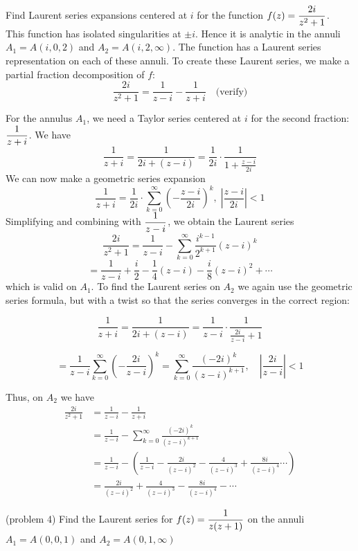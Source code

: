 \documentclass[handout]{ximera}
\begin{document}
\begin{example}[example 4]
Find Laurent series expansions centered at $i$ for the function $\displaystyle f(z) = \frac{2i}{z^2+1}$.\\
This function has isolated singularities at $\pm i$. Hence it is analytic in the annuli
$A_1 = A(i,0,2)$ and $A_2 = A(i, 2, \infty)$. The function has a Laurent series representation on each of these annuli.
To create these Laurent series, we make a partial fraction decomposition of $f$:
\[
\frac{2i}{z^2+1} = \frac{1}{z-i} - \frac{1}{z+i} \quad \text{(verify)}
\]

For the annulus $A_1$, we need a Taylor series centered at $i$ for the second fraction: $\displaystyle \frac{1}{z+i}$.
We have
\[
\frac{1}{z+i} = \frac{1}{2i+(z-i)} = \frac{1}{2i} \cdot \frac{1}{1+ \frac{z-i}{2i}}
\]
We can now make a geometric series expansion 
\[
\frac{1}{z+i} = \frac{1}{2i} \cdot \sum_{k=0}^\infty \left(-\frac{z-i}{2i}\right)^k, \; \left|\frac{z-i}{2i}\right| < 1
\]
Simplifying and combining with $\displaystyle \frac{1}{z-i}$, we obtain the Laurent series
\[
\frac{2i}{z^2+1} = \frac{1}{z-i} - \sum_{k=0}^\infty \frac{i^{k-1}}{2^{k+1}}(z-i)^k 
\]
\[
= \frac{1}{z-i} + \frac{i}{2} - \frac{1}{4}(z-i) - \frac{i}{8}(z-i)^2 + \cdots
\]
which is valid on $A_1$.
To find the Laurent series on $A_2$ we again use the geometric series formula, but with a twist so that the series converges in the correct region:

\[
\frac{1}{z+i} = \frac{1}{2i + (z-i)} = \frac{1}{z-i} \cdot  \frac{1}{\frac{2i}{z-i} +1}
\]

\[
= \frac{1}{z-i} \sum_{k=0}^\infty \left(-\frac{2i}{z-i}\right)^k = \sum_{k=0}^\infty \frac{(-2i)^k}{(z-i)^{k+1}}, \quad \left|\frac{2i}{z-i}\right| < 1
\]

Thus, on $A_2$ we have
\begin{align*}
\frac{2i}{z^2 +1} &= \frac{1}{z-i} -\frac{1}{z+i}\\
&=\frac{1}{z-i} - \sum_{k=0}^\infty \frac{(-2i)^k}{(z-i)^{k+1}}\\
&= \frac{1}{z-i} - \left(\frac{1}{z-i}-\frac{2i}{(z-i)^2}-\frac{4}{(z-i)^3}+\frac{8i}{(z-i)^4} \cdots \right)\\
&= \frac{2i}{(z-i)^2}+\frac{4}{(z-i)^3}-\frac{8i}{(z-i)^4} -\cdots
\end{align*}


\end{example}


\begin{problem}(problem 4)
Find the Laurent series for $\displaystyle f(z) = \frac{1}{z(z+1)}$ on the annuli $A_1 = A(0, 0, 1)$ and $A_2 = A(0, 1, \infty)$
\end{problem}
\end{document}
